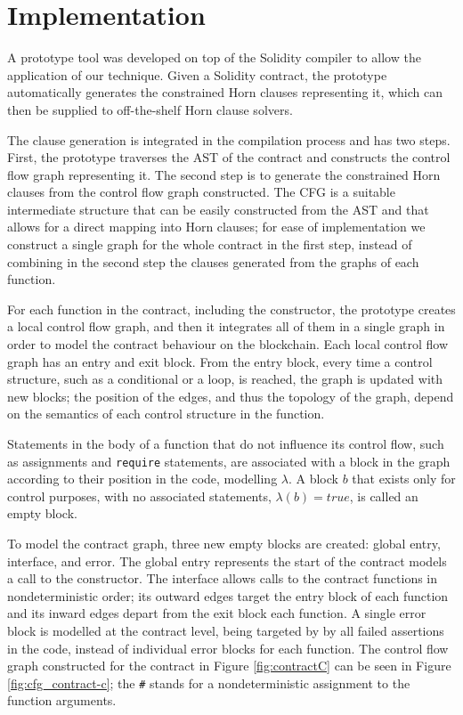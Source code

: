 \section{Implementation}

A prototype tool was developed on top of the Solidity compiler to allow the application of our technique. Given a Solidity contract, the prototype automatically generates the constrained Horn clauses representing it, which can then be supplied to off-the-shelf Horn clause solvers.

The clause generation is integrated in the compilation process and has two steps. First, the prototype traverses the AST of the contract and constructs the control flow graph representing it. The second step is to generate the constrained Horn clauses from the control flow graph constructed. The CFG is a suitable intermediate structure that can be easily constructed from the AST and that allows for a direct mapping into Horn clauses; for ease of implementation we construct a single graph for the whole contract in the first step, instead of combining in the second step the clauses generated from the graphs of each function.

For each function in the contract, including the constructor, the prototype creates a local control flow graph, and then it integrates all of them in a single graph in order to model the contract behaviour on the blockchain. Each local control flow graph has an entry and exit block. From the entry block, every time a control structure, such as a conditional or a loop, is reached, the graph is updated with new blocks; the position of the edges, and thus the topology of the graph, depend on the semantics of each control structure in the function.

Statements in the body of a function that do not influence its control flow, such as assignments and \texttt{require} statements, are associated with a block in the graph according to their position in the code, modelling $\lambda$. A block $b$ that exists only for control purposes, with no associated statements, $\lambda(b) = true$, is called an empty block.

To model the contract graph, three new empty blocks are created: global entry, interface, and error. The global entry represents the start of the contract models a call to the constructor. The interface allows calls to the contract functions in nondeterministic order; its outward edges target the entry block of each function and its inward edges depart from the exit block each function. A single error block is modelled at the contract level, being targeted by by all failed assertions in the code, instead of individual error blocks for each function. The control flow graph constructed for the contract in Figure \ref{fig:contractC} can be seen in Figure \ref{fig:cfg_contract-c}; the \texttt{\#} stands for a nondeterministic assignment to the function arguments. 


